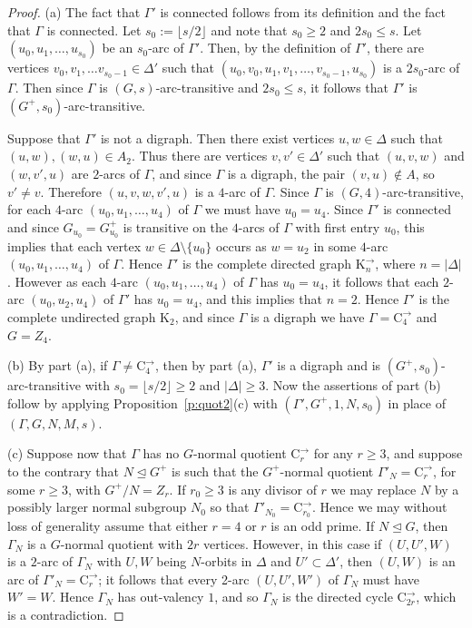 \documentclass[11pt]{amsart}
\newcommand{\C}{{\mathrm{C}}}
\newcommand{\K}{\mathrm{K}}
\begin{document}
\begin{proof}
    (a) The fact that $\Gamma'$ is connected follows from its definition and the fact that $\Gamma$ is connected.
    Let $s_0:=\lfloor s/2\rfloor$ and note that $s_0\geqslant2$ and $2s_0\leqslant s$. Let $(u_0, u_1,\dots, u_{s_0})$ be an $s_0$-arc of $\Gamma'$. Then, by the definition of $\Gamma'$, there are vertices $v_0, v_1, \dots v_{s_0-1}\in \Delta'$ such that $(u_0, v_0, u_1, v_1,\dots, v_{s_0-1}, u_{s_0})$ is a $2s_0$-arc of $\Gamma$. Then since $\Gamma$ is \((G,s)\)-arc-transitive and $2s_0\leqslant s$, it follows that $\Gamma'$ is \((G^+,s_0)\)-arc-transitive. 
    
    Suppose that $\Gamma'$ is not a digraph. Then there exist vertices $u,w\in \Delta$ such that $(u,w), (w,u)\in A_2$. Thus there are vertices $v,v'\in\Delta'$ such that $(u,v,w)$ and $(w,v',u)$ are $2$-arcs of $\Gamma$, and since $\Gamma$ is a digraph, the pair $(v,u)\not\in A$, so $v'\ne v$. Therefore $(u,v,w,v',u)$ is a $4$-arc of $\Gamma$. Since $\Gamma$  is \((G,4)\)-arc-transitive, for each $4$-arc $(u_0, u_1,\dots, u_{4})$ of $\Gamma$ we must have $u_0=u_4$. Since $\Gamma'$ is connected and since $G_{u_0}=G^+_{u_0}$ is transitive on the $4$-arcs of $\Gamma$ with first entry $u_0$, this implies that each vertex $w\in\Delta\setminus\{u_0\}$ occurs as $w=u_2$ in some $4$-arc $(u_0, u_1,\dots, u_{4})$ of $\Gamma$. Hence $\Gamma'$ is the complete directed graph $\K_n^\to$, where $n=|\Delta|$. However as each  $4$-arc $(u_0, u_1,\dots, u_{4})$ of $\Gamma$ has $u_0=u_4$, it follows that each $2$-arc $(u_0, u_2,u_{4})$ of $\Gamma'$ has $u_0=u_4$, and this implies that $n=2$. Hence $\Gamma'$ is the complete undirected graph $\K_2$, and since $\Gamma$ is a digraph we have $\Gamma=\C_4^\to$ and $G=Z_4$.

    (b) By part (a), if $\Gamma\ne \C_4^\to$, then by part (a), $\Gamma'$ is a digraph and is \((G^+,s_0)\)-arc-transitive with $s_0=\lfloor s/2\rfloor\geqslant2$ and $|\Delta|\geqslant3$. Now the assertions of part (b) follow by applying Proposition~\ref{p:quot2}(c) with $(\Gamma',G^+, 1, N, s_0)$ in place of $(\Gamma, G, N, M, s)$.
    
    (c) Suppose now that $\Gamma$ has no $G$-normal quotient $\C_r^\to$ for any $r\geq3$, and suppose to the contrary that $N\unlhd G^+$ is such that the $G^+$-normal quotient $\Gamma'_N=\C_r^\to$, for some $r\geq3$, with $G^+/N=Z_r$. If $r_0\geq3$ is any divisor of $r$ we may replace $N$ by a possibly larger normal subgroup $N_0$ so that $\Gamma'_{N_0}=\C_{r_0}^\to$. Hence we may without loss of generality assume that either $r=4$ or $r$ is an odd prime. If $N\unlhd G$, then $\Gamma_N$ is a $G$-normal quotient with $2r$ vertices. However, in this case if $(U, U', W)$ is a $2$-arc of $\Gamma_N$ with $U, W$ being $N$-orbits in $\Delta$ and $U'\subset \Delta'$, then $(U,W)$ is an arc of $\Gamma'_N=\C_r^\to$;  it follows that every 2-arc $(U,U', W')$ of $\Gamma_N$ must have $W'=W$. Hence $\Gamma_N$ has out-valency $1$, and so $\Gamma_N$ is the directed cycle $\C_{2r}^\to$, which is a contradiction.


\end{proof}
\end{document}
